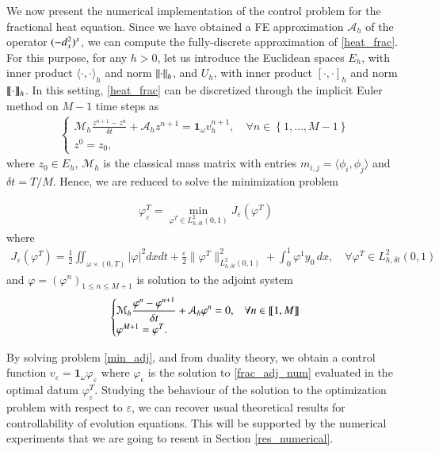 We now present the numerical implementation of the control problem for the fractional heat equation. Since we have obtained a FE approximation $\mathcal A_h$ of the operator $(-d_x^2)^{s}$, we can compute the fully-discrete approximation of \eqref{heat_frac}. For this purpose, for any $h>0$, let us introduce the Euclidean spaces $E_h$, with inner product $\langle\cdot,\cdot\rangle_h$ and norm ${\left\|\cdot\right\|}_{h}$, and $U_h$, with inner product $[\cdot,\cdot]_h$ and norm $\llbracket \cdot\rrbracket_h$. In this setting, \eqref{heat_frac} can be discretized through the implicit Euler method on $M-1$ time steps as
\begin{align}\label{frac_heat_num}
	\begin{cases}
		\displaystyle\mathcal M_h \frac{z^{n+1}-z^n}{\delta t}+\mathcal A_h z^{n+1}=\mathbf{1}_\omega v_h^{n+1}, \quad \forall n\in \left\{1,\ldots,M-1\right\}
		\\
		z^0=z_0, 
	\end{cases}
\end{align}
where $z_0\in E_h$, $\mathcal M_h$ is the classical mass matrix with entries $m_{i,j}=\langle \phi_i,\phi_j\rangle$ and $\delta t=T/M$. Hence, we are reduced to solve the minimization problem

\begin{align}\label{min_adj}
	\varphi_\varepsilon^T=\min_{\varphi^T\in L^2_{h,\delta t}(0,1)}J_\varepsilon(\varphi^T)
\end{align}
where
\begin{align*}
	J_\varepsilon(\varphi^T)=\frac{1}{2}\iint_{\omega\times(0,T)}|\varphi|^2dxdt+\frac{\varepsilon}{2}\|\varphi^T\|^2_{L^2_{h,\delta t}(0,1)}+\int_{0}^{1}\varphi^1y_0\,dx, \quad \forall \varphi^T\in L_{h,\delta t}^2(0,1)
\end{align*}
and $\varphi=(\varphi^n)_{1\leq n\leq M+1}$ is solution to the adjoint system
\begin{align}\label{frac_adj_num}
	\begin{cases}
		\displaystyle\mathcal M_h \frac{\varphi^n-\varphi^{n+1}}{\delta t}+\mathcal A_h \varphi^n=0, & \forall n\in\llbracket 1,M\rrbracket
		\\
		\varphi^{M+1}=\varphi^T. 
	\end{cases}
\end{align}

By solving problem \eqref{min_adj}, and from duality theory, we obtain a control function
$v_\varepsilon=\mathbf{1}_\omega\varphi_\varepsilon$ where $\varphi_\epsilon$ is the solution to \eqref{frac_adj_num} evaluated in the optimal datum $\varphi_\varepsilon^T$. Studying the behaviour of the solution to the optimization problem with respect to $\varepsilon$, we can recover usual theoretical results for controllability of evolution equations. This will be supported by  the numerical experiments that we are going to resent in Section \ref{res_numerical}.




